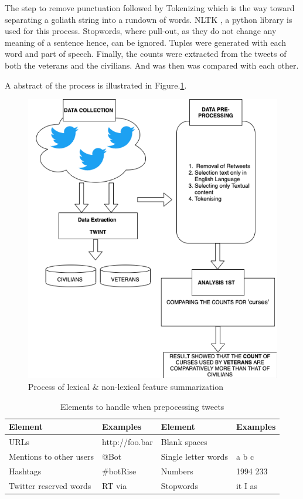The step to remove punctuation followed by Tokenizing which is the way toward separating a goliath string into a rundown of words. NLTK \citep{NLTK}, a python library is used for this process. Stopwords, where pull-out, as they do not change any meaning of a sentence hence, can be ignored. Tuples were generated with each word and part of speech. Finally, the counts were extracted from the tweets of both the veterans and the civilians. And was then was compared with each other.

A abstract of the process is illustrated in Figure.\ref{fig:exp1}.

\begin{figure}[h]
  \centering
  \includegraphics{images/exp1process.png}
  \caption{Process of lexical \& non-lexical feature summarization}
  \label{fig:exp1}
\end{figure}

\begin{table}[h]
  \caption{Elements to handle when prepocessing tweets}
  \label{table:elementsRemoved}
  \centering
  \renewcommand{\tabularxcolumn}{m} %
  \begin{tabularx}{\textwidth}{l  l || l  l}
    \toprule
    \textbf{Element} & \textbf{Examples} & \textbf{Element}    & \textbf{Examples}
    \tabularnewline \midrule
    URLs
                     &
    http://foo.bar   & Blank spaces      &
    \tabularnewline \hline
    Mentions to other users
                     & @Bot              & Single letter words & a b c
    \tabularnewline \hline
    Hashtags
                     & \#botRise         & Numbers             & 1994 233
    \tabularnewline \hline
    Twitter reserved words
                     & RT via            & Stopwords
                     & it I as
    \tabularnewline \bottomrule
  \end{tabularx}
\end{table}

